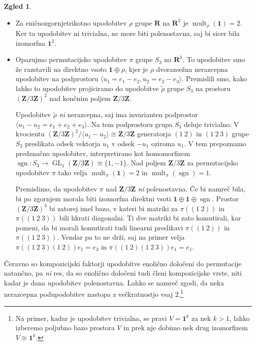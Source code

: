 \documentclass[11pt]{book}
\def\ZZ{\mathbf{Z}}
\def\RR{\mathbf{R}}
\def\oneone{\mathbf{1}}
\DeclareMathOperator\sgn{sgn}
\DeclareMathOperator\mult{mult}
\DeclareMathOperator\GL{GL}
\theoremstyle{definition}
\theoremstyle{zgled}
\newtheorem{zgled}[theorem]{Zgled}
\theoremstyle{zgledbrezstevilke}
\theoremstyle{odprtproblem}
\theoremstyle{domacanaloga}
\theoremstyle{izrek}
\begin{document}
\begin{zgled} \leavevmode
\begin{itemize}
    \item Za eničnozgornjetrikotno upodobitev $\rho$ grupe $\RR$ na $\RR^2$ je $\mult_{\rho}(\oneone) = 2$. Ker ta upodobitev ni trivialna, ne more biti polenostavna, saj bi sicer bila izomorfna $\oneone^2$.

    \item Opazujmo permutacijsko upodobitev $\pi$ grupe $S_3$ na $\RR^3$. To upodobitev smo že razstavili na direktno vsoto $\oneone \oplus \rho$, kjer je $\rho$ dvorazsežna nerazcepna upodobitev na podprostoru $\langle u_1 = e_1 - e_2, u_2 = e_2 - e_3 \rangle$. Premislili smo, kako lahko to upodobitev projiciramo do upodobitve $\tilde \rho$ grupe $S_3$ na prostoru $(\ZZ/3\ZZ)^2$ nad končnim poljem $\ZZ/3\ZZ$. 

    Upodobitev $\tilde \rho$ \emph{ni} nerazcepna, saj ima invarianten podprostor $\langle u_1 - u_2 = e_1 + e_2 + e_3 \rangle$. Na tem podprostoru grupa $S_3$ deluje trivialno. V kvocientu $(\ZZ/3\ZZ)^2/\langle u_1 - u_2 \rangle \cong \ZZ/3\ZZ$ generatorja $(1\ 2)$ in $(1 \ 2 \ 3)$ grupe $S_3$ preslikata odsek vektorja $u_1$ v odsek $-u_1$ oziroma $u_1$. V tem prepoznamo predznačno upodobitev, interpretirano kot homomorfizem $\sgn \colon S_3 \to \GL_1(\ZZ/3\ZZ) \cong \{ 1, -1 \}$. Nad poljem $\ZZ/3\ZZ$ za permutacijsko upodobitev $\pi$ tako velja $\mult_{\pi}(\oneone) = 2$ in $\mult_{\pi}(\sgn) = 1$.

    Premislimo, da upodobitev $\pi$ nad $\ZZ/3\ZZ$ \emph{ni} polenostavna. Če bi namreč bila, bi po zgornjem morala biti izomorfna direktni vsoti $\oneone \oplus \oneone \oplus \sgn$. Prostor $(\ZZ/3\ZZ)^3$ bi zatorej imel bazo, v kateri bi matriki za $\pi((1 \ 2))$ in $\pi((1 \ 2 \ 3))$ bili hkrati diagonalni. Ti dve matriki bi zato komutirali, kar pomeni, da bi morali komutirati tudi linearni preslikavi $\pi((1 \ 2))$ in $\pi((1 \ 2 \ 3))$. Vendar pa to ne drži, saj na primer velja $\pi((1 \ 2 \ 3)(1 \ 2)) e_1 = e_3$ in $\pi((1 \ 2)(1 \ 2 \ 3)) e_1 = e_1$.
\end{itemize}
\end{zgled}

Čeravno so kompozicijski faktorji upodobitve enolično določeni do permutacije natančno, pa \emph{ni} res, da so enolično določeni tudi členi kompozicijske vrste, niti kadar je dana upodobitev polenostavna. Lahko se namreč zgodi, da neka nerazcepna podupodobitev nastopa z večkratnostjo vsaj $2$.\footnote{Na primer, kadar je upodobitev trivialna, se pravi $V = \oneone^k$ za nek $k > 1$, lahko izberemo poljubno bazo prostora $V$ in prek nje dobimo nek drug izomorfizem $V \cong \oneone^k$.} 
\end{document}
